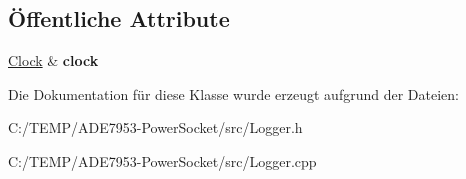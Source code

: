 \subsection*{Öffentliche Attribute}
\begin{DoxyCompactItemize}
\item 
\mbox{\label{class_l_o_g_g_i_n_g_a7d93954ed4981f9309f69b09bd5a54ff}} 
\hyperlink{class_clock}{Clock} \& {\bfseries clock}
\end{DoxyCompactItemize}


Die Dokumentation für diese Klasse wurde erzeugt aufgrund der Dateien\+:\begin{DoxyCompactItemize}
\item 
C\+:/\+T\+E\+M\+P/\+A\+D\+E7953-\/\+Power\+Socket/src/Logger.\+h\item 
C\+:/\+T\+E\+M\+P/\+A\+D\+E7953-\/\+Power\+Socket/src/Logger.\+cpp\end{DoxyCompactItemize}
